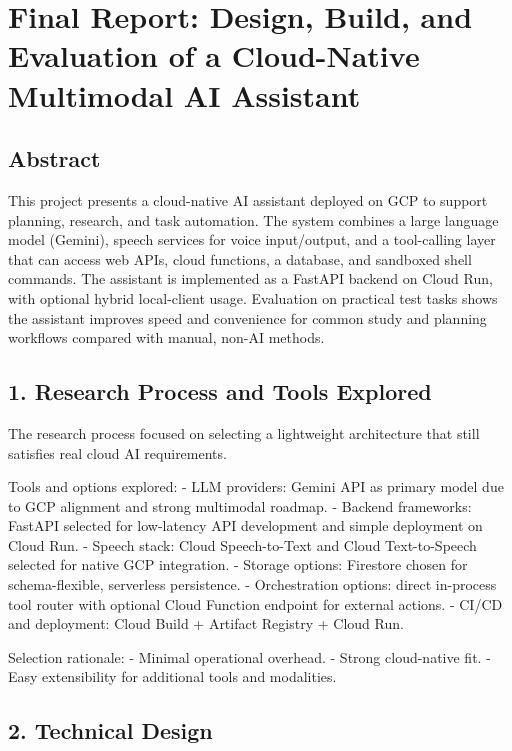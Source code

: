 \documentclass[
]{article}
\author{}
\date{}
\begin{document}
\section{Final Report: Design, Build, and Evaluation of a Cloud-Native
Multimodal AI
Assistant}\label{final-report-design-build-and-evaluation-of-a-cloud-native-multimodal-ai-assistant}

\subsection{Abstract}\label{abstract}

This project presents a cloud-native AI assistant deployed on GCP to
support planning, research, and task automation. The system combines a
large language model (Gemini), speech services for voice input/output,
and a tool-calling layer that can access web APIs, cloud functions, a
database, and sandboxed shell commands. The assistant is implemented as
a FastAPI backend on Cloud Run, with optional hybrid local-client usage.
Evaluation on practical test tasks shows the assistant improves speed
and convenience for common study and planning workflows compared with
manual, non-AI methods.

\subsection{1. Research Process and Tools
Explored}\label{research-process-and-tools-explored}

The research process focused on selecting a lightweight architecture
that still satisfies real cloud AI requirements.

Tools and options explored: - LLM providers: Gemini API as primary model
due to GCP alignment and strong multimodal roadmap. - Backend
frameworks: FastAPI selected for low-latency API development and simple
deployment on Cloud Run. - Speech stack: Cloud Speech-to-Text and Cloud
Text-to-Speech selected for native GCP integration. - Storage options:
Firestore chosen for schema-flexible, serverless persistence. -
Orchestration options: direct in-process tool router with optional Cloud
Function endpoint for external actions. - CI/CD and deployment: Cloud
Build + Artifact Registry + Cloud Run.

Selection rationale: - Minimal operational overhead. - Strong
cloud-native fit. - Easy extensibility for additional tools and
modalities.

\subsection{2. Technical Design}\label{technical-design}
\end{document}
